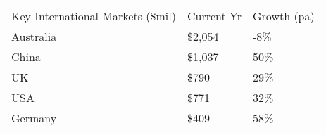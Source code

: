 \begin{tabular}[t]{p{5.1cm}>{\hfill}p{1.1cm}>{\hfill}p{1.3cm}}
 Key International Markets (\$mil) & Current Yr & Growth (pa) \\ 
 Australia & \$2,054 & -8\% \\ 
  China & \$1,037 & 50\% \\ 
  UK & \$790   & 29\% \\ 
  USA & \$771   & 32\% \\ 
  Germany & \$409   & 58\% \\ 
  \end{tabular}
